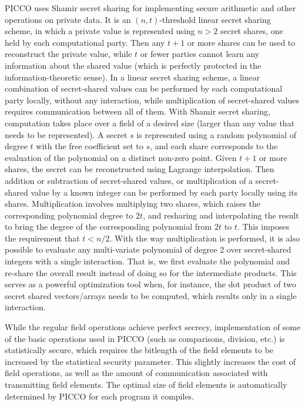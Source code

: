 \documentclass[11pt]{article}
\begin{document}
PICCO uses Shamir secret sharing \cite{sha79} for implementing secure
arithmetic and other operations on private data. It is an $(n,t)$-threshold
linear secret sharing scheme, in which a private value is represented using
$n > 2$ secret shares, one held by each computational party. Then any $t+1$
or more shares can be used to reconstruct the private value, while $t$ or
fewer parties cannot learn any information about the shared value (which is
perfectly protected in the information-theoretic sense). In a linear secret
sharing scheme, a linear combination of secret-shared values can be
performed by each computational party locally, without any interaction,
while multiplication of secret-shared values requires communication between
all of them. With Shamir secret sharing, computation takes place over a
field of a desired size (larger than any value that needs to be
represented). A secret $s$ is represented using a random polynomial of
degree $t$ with the free coefficient set to $s$, and each share corresponds
to the evaluation of the polynomial on a distinct non-zero point. Given
$t+1$ or more shares, the secret can be reconstructed using Lagrange
interpolation. Then addition or subtraction of secret-shared values, or
multiplication of a secret-shared value by a known integer can be performed
by each party locally using its shares. Multiplication involves multiplying
two shares, which raises the corresponding polynomial degree to $2t$, and
resharing and interpolating the result to bring the degree of the
corresponding polynomial from $2t$ to $t$. This imposes the requirement that
$t < n/2$. With the way multiplication is performed, it is also possible to
evaluate any multi-variate polynomial of degree 2 over secret-shared
integers with a single interaction. That is, we first evaluate the
polynomial and re-share the overall result instead of doing so for the
intermediate products. This serves as a powerful optimization tool when, for
instance, the dot product of two secret shared vectors/arrays needs to be
computed, which results only in a single interaction.

While the regular field operations achieve perfect secrecy, implementation
of some of the basic operations used in PICCO (such as comparisons,
division, etc.) is statistically secure, which requires the bitlength of
the field elements to be increased by the statistical security parameter.
This slightly increases the cost of field operations, as well as the amount of
communication associated with transmitting field elements. The optimal size of
field elements is automatically determined by PICCO for each program it
compiles.
\end{document}
